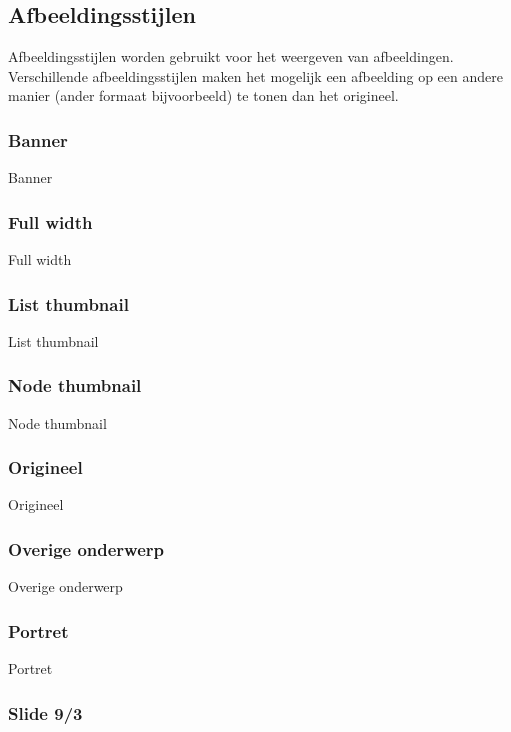 \subsection{Afbeeldingsstijlen}\label{afbeeldingsstijlen}

Afbeeldingsstijlen worden gebruikt voor het weergeven van afbeeldingen. Verschillende afbeeldingsstijlen maken het mogelijk een afbeelding op een andere manier (ander formaat bijvoorbeeld) te tonen dan het origineel. 

\subsubsection{Banner}

Banner 

\subsubsection{Full width}

Full width 

\subsubsection{List thumbnail}

List thumbnail 

\subsubsection{Node thumbnail}

Node thumbnail 

\subsubsection{Origineel}

Origineel 

\subsubsection{Overige onderwerp}

Overige onderwerp 

\subsubsection{Portret}

Portret 

\subsubsection{Slide 9/3}

